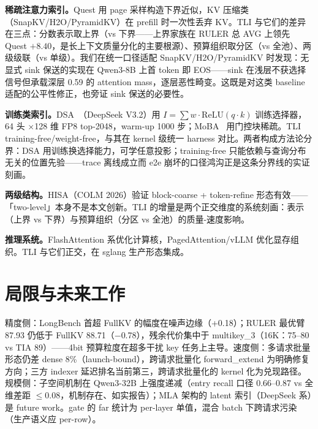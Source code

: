 \documentclass[11pt]{article}
\begin{document}
\textbf{稀疏注意力索引。}Quest 用 page 采样构造下界近似，KV 压缩类（SnapKV/H2O/PyramidKV）在 prefill 时一次性丢弃 KV。TLI 与它们的差异在三点：分数表示取上界（vs 下界——上界家族在 RULER 总 AVG 上领先 Quest $+8.40$，是长上下文质量分化的主要根源）、预算组织取分区（vs 全池）、两级级联（vs 单级）。我们在统一口径适配 SnapKV/H2O/PyramidKV 时发现：无显式 sink 保送的实现在 Qwen3-8B 上首 token 即 EOS——sink 在浅层不获选择信号但承载深层 0.59 的 attention mass，逐层恶性畸变。这既是对这类 baseline 适配的公平性修正，也旁证 sink 保送的必要性。

\textbf{训练类索引。}DSA~\cite{dsa}（DeepSeek V3.2）用 $I=\sum w\cdot\mathrm{ReLU}(q\cdot k)$ 训练选择器，64 头 $\times$128 维 FP8 top-2048，warm-up 1000 步；MoBA~\cite{moba} 用门控块稀疏。TLI training-free/weight-free，与其在 kernel 级统一 harness 对比。两者构成方法论分界：DSA 用训练换选择能力，可学任意投影；training-free 只能依赖与查询分布无关的位置先验——trace 离线成立而 e2e 崩坏的口径鸿沟正是这条分界线的实证刻画。

\textbf{两级结构。}HISA（COLM 2026）验证 block-coarse + token-refine 形态有效——「two-level」本身不是本文创新。TLI 的增量是两个正交维度的系统刻画：表示（上界 vs 下界）与预算组织（分区 vs 全池）的质量-速度影响。

\textbf{推理系统。}FlashAttention 系优化计算核，PagedAttention/vLLM 优化显存组织。TLI 与它们正交，在 sglang 生产形态集成。

\section{局限与未来工作}

精度侧：LongBench 首超 FullKV 的幅度在噪声边缘（+0.18）；RULER 最优臂 87.93 仍低于 FullKV 88.71（$-$0.78），残余代价集中于 multikey\_3（16K：75--80 vs TIA 89）——4bit 预算粒度在超多干扰 key 任务上主导。速度侧：多请求批量形态仍差 dense 8\%（launch-bound），跨请求批量化 forward\_extend 为明确修复方向；三方 indexer 延迟排名当前第三，跨请求批量化的 kernel 化为兑现路径。规模侧：子空间机制在 Qwen3-32B 上强度递减（entry recall 口径 0.66--0.87 vs 全维差距 $\leq$0.08，机制存在、如实报告）；MLA 架构的 latent 索引（DeepSeek 系）是 future work。gate 的 far 统计为 per-layer 单值，混合 batch 下跨请求污染（生产语义应 per-row）。

\end{document}
